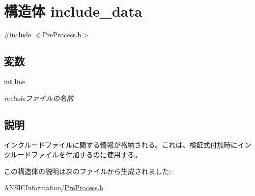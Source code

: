 \hypertarget{structinclude__data}{
\section{構造体 include\_\-data}
\label{structinclude__data}
}


{\ttfamily \#include $<$PreProcess.h$>$}

\subsection*{変数}
\begin{DoxyCompactItemize}
\item 
\hypertarget{structinclude__data_a45201a24f55b5f41717179ce2de083aa}{
int \hyperlink{structinclude__data_a45201a24f55b5f41717179ce2de083aa}{line}}
\label{structinclude__data_a45201a24f55b5f41717179ce2de083aa}

\begin{DoxyCompactList}\small\item\em includeファイルの名前 \item\end{DoxyCompactList}\end{DoxyCompactItemize}


\subsection{説明}
インクルードファイルに関する情報が格納される。これは、検証式付加時にインクルードファイルを付加するのに使用する。 

この構造体の説明は次のファイルから生成されました:\begin{DoxyCompactItemize}
\item 
ANSICInformation/\hyperlink{PreProcess_8h}{PreProcess.h}\end{DoxyCompactItemize}
